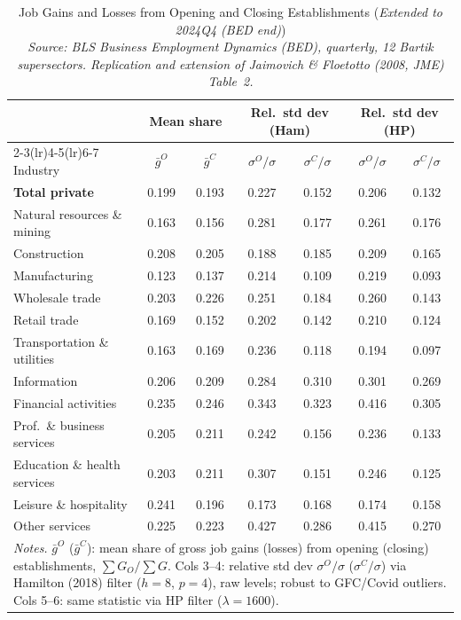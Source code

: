 \documentclass[authoryear, review, 12pt]{elsarticle}
\begin{document}
	\begin{table}[H]
		\centering
		\small
		\begin{tabular}{lcccccc}
			\toprule
			& \multicolumn{2}{c}{Mean share} & \multicolumn{2}{c}{Rel.\ std dev (Ham)} & \multicolumn{2}{c}{Rel.\ std dev (HP)} \\
			\cmidrule(lr){2-3}\cmidrule(lr){4-5}\cmidrule(lr){6-7}
			Industry & $\bar{g}^O$ & $\bar{g}^C$ & $\sigma^O/\sigma$ & $\sigma^C/\sigma$ & $\sigma^O/\sigma$ & $\sigma^C/\sigma$ \\
			\midrule
			\midrule
			\textbf{Total private} & 0.199 & 0.193 & 0.227 & 0.152 & 0.206 & 0.132 \\
			Natural resources \& mining & 0.163 & 0.156 & 0.281 & 0.177 & 0.261 & 0.176 \\
			Construction & 0.208 & 0.205 & 0.188 & 0.185 & 0.209 & 0.165 \\
			Manufacturing & 0.123 & 0.137 & 0.214 & 0.109 & 0.219 & 0.093 \\
			Wholesale trade & 0.203 & 0.226 & 0.251 & 0.184 & 0.260 & 0.143 \\
			Retail trade & 0.169 & 0.152 & 0.202 & 0.142 & 0.210 & 0.124 \\
			Transportation \& utilities & 0.163 & 0.169 & 0.236 & 0.118 & 0.194 & 0.097 \\
			Information & 0.206 & 0.209 & 0.284 & 0.310 & 0.301 & 0.269 \\
			Financial activities & 0.235 & 0.246 & 0.343 & 0.323 & 0.416 & 0.305 \\
			Prof.~\& business services & 0.205 & 0.211 & 0.242 & 0.156 & 0.236 & 0.133 \\
			Education \& health services & 0.203 & 0.211 & 0.307 & 0.151 & 0.246 & 0.125 \\
			Leisure \& hospitality & 0.241 & 0.196 & 0.173 & 0.168 & 0.174 & 0.158 \\
			Other services & 0.225 & 0.223 & 0.427 & 0.286 & 0.415 & 0.270 \\
			\midrule
			\multicolumn{7}{p{0.92\linewidth}}{\footnotesize \textit{Notes.} $\bar{g}^O$ ($\bar{g}^C$): mean share of gross job gains (losses) from opening (closing) establishments, $\sum G_O/\sum G$. Cols 3--4: relative std dev $\sigma^O/\sigma$ ($\sigma^C/\sigma$) via Hamilton (2018) filter ($h{=}8$, $p{=}4$), raw levels; robust to GFC/Covid outliers. Cols 5--6: same statistic via HP filter ($\lambda{=}1600$).} \\
			\bottomrule
		\end{tabular}
		\caption{Job Gains and Losses from Opening and Closing Establishments (\emph{Extended to 2024Q4 (BED end)}) \\[2pt]
			{\small\itshape Source: BLS Business Employment Dynamics (BED), quarterly, 12 Bartik supersectors. Replication and extension of Jaimovich \& Floetotto (2008, JME) Table~2.}}
		\label{tab:jf_t2_ext_2024}
	\end{table}
	
\end{document}
